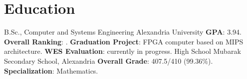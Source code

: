 \documentclass[letterpaper]{twentysecondcv} %
\begin{document}





\makeprofile


\section{Education}

\begin{twenty} %
               {B.Sc., Computer and Systems Engineering}
               {Alexandria University}
               {\textbf{GPA}: 3.94.\newline
                \textbf{Overall Ranking}: \underline{}.\newline
                \textbf{Graduation Project}: FPGA computer based on MIPS architecture.\newline
                \textbf{WES Evaluation}: currently in progress.\newline
               }
               {High School}
               {Mubarak Secondary School, Alexandria}
               {\textbf{Overall Grade}: 407.5/410 (99.36\%).\newline
                \textbf{Specialization}: Mathematics.}
\end{twenty}
\end{document}
